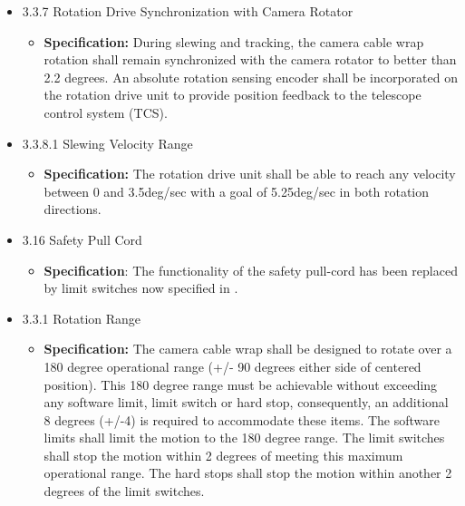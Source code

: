 \documentclass[SE,authoryear,toc, lsstdraft]{lsstdoc}
\begin{document}
\begin{itemize}
\item
  3.3.7 Rotation Drive Synchronization with Camera Rotator

  \begin{itemize}
  \item
    \textbf{Specification:} During slewing and tracking, the camera
    cable wrap rotation shall remain synchronized with the camera
    rotator to better than 2.2 degrees. An absolute rotation sensing
    encoder shall be incorporated on the rotation drive unit to provide
    position feedback to the telescope control system (TCS).
  \end{itemize}
\item
  3.3.8.1 Slewing Velocity Range

  \begin{itemize}
  \item
    \textbf{Specification:} The rotation drive unit shall be able to
    reach any velocity between 0 and 3.5deg/sec with a goal of
    5.25deg/sec in both rotation directions.
  \end{itemize}
\item
  3.16 Safety Pull Cord

  \begin{itemize}
  \item
    \textbf{Specification}: The functionality of the safety pull-cord
    has been replaced by limit switches now specified in .
  \end{itemize}
\item
  3.3.1 Rotation Range

  \begin{itemize}
  \item
    \textbf{Specification:} The camera cable wrap shall be designed to rotate
    over a 180 degree operational range (+/- 90 degrees either side of
    centered position). This 180 degree range must be achievable without
    exceeding any software limit, limit switch or hard stop,
    consequently, an additional 8 degrees (+/-4) is required to
    accommodate these items. The software limits shall limit the motion
    to the 180 degree range. The limit switches shall stop the motion
    within 2 degrees of meeting this maximum operational range. The hard
    stops shall stop the motion within another 2 degrees of the limit
    switches.
  \end{itemize}
\end{itemize}

\underline{}
\end{document}
